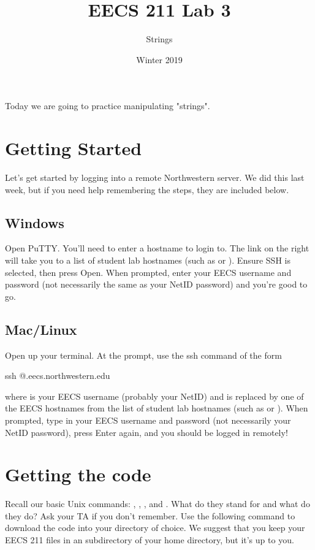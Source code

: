 \documentclass{tufte-handout}
\title{EECS 211 Lab 3}
\author{Strings}
\date{Winter 2019}
\begin{document}
\maketitle

Today we are going to practice manipulating "strings".

\section{Getting Started}
Let's get started by logging into a remote Northwestern server. We did this last week, but if you need help remembering the steps, they are included below.

\subsection{Windows}
Open PuTTY. You'll need to enter a hostname to login to. The link on the right will take you to a list of student lab hostnames (such as   or ).  Ensure SSH is selected, then press Open. When prompted, enter your EECS username and password (not necessarily the same as your NetID password) and you're good to go.

\subsection{Mac/Linux}
Open up your terminal. At the prompt, use the ssh command of the form
\begin{CmdLine}
  \prompt ssh @.eecs.northwestern.edu
\end{CmdLine}
\noindent where  is your EECS username (probably your NetID)
and  is replaced by one of the EECS hostnames from the list
of student lab hostnames (such as  or
).
When prompted, type in your EECS username and password (not necessarily your NetID password), press
Enter again, and you should be logged in remotely!

\section{Getting the code}
Recall our basic Unix commands: , , , and . What do they stand for and what do they do? Ask your TA if you don't remember. Use the following  command to download the code into your directory of choice. We suggest that you keep your EECS 211 files in an  subdirectory of your home directory, but it's up to you.
\end{document}
